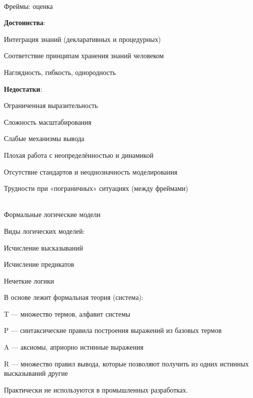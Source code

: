 \begin{frame}{\\Фреймы: оценка}
	\topline
	\justifying
	
	\vspace{10mm}
	\textbf{Достоинства}:
	\begin{textitemize}
		\item Интеграция знаний (декларативных и процедурных)
		\item Соответствие принципам хранения знаний человеком
		\item Наглядность, гибкость, однородность
	\end{textitemize}
	
	\textbf{Недостатки}:
	\begin{textitemize}
		\item Ограниченная выразительность
		\item Сложность масштабирования
		\item Слабые механизмы вывода
		\item Плохая работа с неопределённостью и динамикой
		\item Отсутствие стандартов и неоднозначность моделирования
		\item Трудности при «пограничных» ситуациях (между фреймами)
	\end{textitemize}
	
\end{frame}

\begin{frame}{\\Формальные логические модели}
	\topline
	\justifying
	
	\vspace{10mm}
	Виды логических моделей:
	\begin{textitemize}
		\item Исчисление высказываний
		\item Исчисление предикатов
		\item Нечеткие логики
	\end{textitemize}
	
	В основе лежит формальная теория (система):
	\begin{textitemize}
		\item T --- множество термов, алфавит системы
		\item P --- синтаксические правила построения выражений из базовых термов
		\item A --- аксиомы, априорно истинные выражения
		\item R --- множество правил вывода, которые позволяют получить из одних истинных высказываний другие
	\end{textitemize}
	
	Практически не используются в промышленных разработках.
	
\end{frame}

